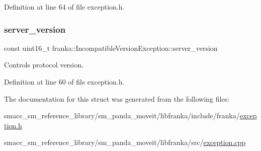 Definition at line 64 of file exception.\+h.

\mbox{\label{structfranka_1_1IncompatibleVersionException_a0928098d8c32f405d17b65a0f004b5ab}} 
\subsubsection{\texorpdfstring{server\+\_\+version}{server\_version}}
{\footnotesize\ttfamily const uint16\+\_\+t franka\+::\+Incompatible\+Version\+Exception\+::server\+\_\+version}

Control\textquotesingle{}s protocol version. 

Definition at line 60 of file exception.\+h.



The documentation for this struct was generated from the following files\+:\begin{DoxyCompactItemize}
\item 
smacc\+\_\+sm\+\_\+reference\+\_\+library/sm\+\_\+panda\+\_\+moveit/libfranka/include/franka/\hyperlink{exception_8h}{exception.\+h}\item 
smacc\+\_\+sm\+\_\+reference\+\_\+library/sm\+\_\+panda\+\_\+moveit/libfranka/src/\hyperlink{exception_8cpp}{exception.\+cpp}\end{DoxyCompactItemize}
